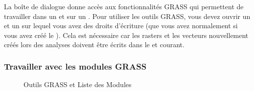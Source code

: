 La bo\^ite de dialogue  donne acc\`es aux fonctionnalit\'es GRASS qui permettent de travailler dans un  et sur un . Pour utiliser les outils GRASS, vous devez ouvrir un  et un  sur lequel vous avez des droits d'\'ecriture (que vous avez normalement si vous avez cr\'e\'e le ). Cela est n\'ecessaire car les rasters et les vecteurs nouvellement cr\'e\'es lors des analyses doivent \^etre \'ecrits dans le  et  courant.


\subsubsection{Travailler avec les modules GRASS} 

\begin{figure}[h]
\centering
\caption{Outils GRASS et Liste des Modules \nixcaption}\label{fig:grass_modules}
   \goodgap
\end{figure}

